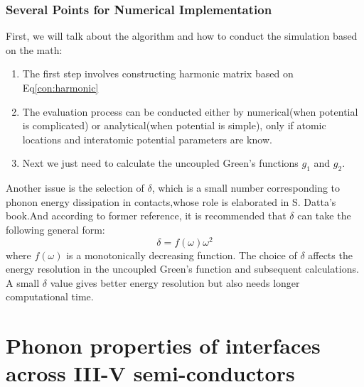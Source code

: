 \subsubsection*{Several Points for Numerical Implementation}
First, we will talk about the algorithm and how to conduct the simulation based on the math:
\begin{enumerate}
\item The first step involves constructing harmonic matrix based on Eq\ref{con:harmonic}
\item The evaluation process can be conducted either by numerical(when potential is complicated) or analytical(when potential is simple), only if atomic locations and interatomic potential parameters are know.
\item Next we just need to calculate the uncoupled Green's functions $g_1$ and $g_2$.
\end{enumerate}
Another issue is the selection of $\delta$, which is a small number corresponding to phonon energy dissipation in contacts,whose role is elaborated in S. Datta's book\cite{Datta}.And according to former reference, it is recommended that $\delta$ can take the following general form\cite{ATF}:
\begin{equation}
\delta=f(\omega) \omega^2
\end{equation}
where $f(\omega)$ is a monotonically decreasing function.
The choice of $\delta$ affects the energy resolution in the uncoupled Green's function and subsequent calculations\cite{ReviewATF}. A small $\delta$ value gives better energy resolution but also needs longer computational time.

\section{Phonon properties of interfaces across III-V semi-conductors}

